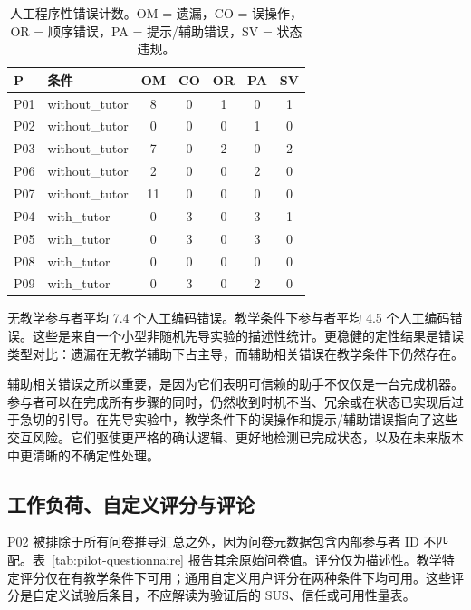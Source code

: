 \begin{table}[htbp]
\centering
\caption{人工程序性错误计数。OM = 遗漏，CO = 误操作，OR = 顺序错误，PA = 提示/辅助错误，SV = 状态违规。}
\label{tab:pilot-errors}
\small
\begin{tabular}{@{}llccccc@{}}
\toprule
\textbf{P} & \textbf{条件} & \textbf{OM} & \textbf{CO} & \textbf{OR} & \textbf{PA} & \textbf{SV} \\
\midrule
P01 & without\_tutor & 8  & 0 & 1 & 0 & 1 \\
P02 & without\_tutor & 0  & 0 & 0 & 1 & 0 \\
P03 & without\_tutor & 7  & 0 & 2 & 0 & 2 \\
P06 & without\_tutor & 2  & 0 & 0 & 2 & 0 \\
P07 & without\_tutor & 11 & 0 & 0 & 0 & 0 \\
\midrule
P04 & with\_tutor & 0  & 3 & 0 & 3 & 1 \\
P05 & with\_tutor & 0  & 3 & 0 & 3 & 0 \\
P08 & with\_tutor & 0  & 0 & 0 & 0 & 0 \\
P09 & with\_tutor & 0  & 3 & 0 & 2 & 0 \\
\bottomrule
\end{tabular}
\end{table}

无教学参与者平均 7.4 个人工编码错误。教学条件下参与者平均 4.5 个人工编码错误。这些是来自一个小型非随机先导实验的描述性统计。更稳健的定性结果是错误类型对比：遗漏在无教学辅助下占主导，而辅助相关错误在教学条件下仍然存在。

辅助相关错误之所以重要，是因为它们表明可信赖的助手不仅仅是一台完成机器。参与者可以在完成所有步骤的同时，仍然收到时机不当、冗余或在状态已实现后过于急切的引导。在先导实验中，教学条件下的误操作和提示/辅助错误指向了这些交互风险。它们驱使更严格的确认逻辑、更好地检测已完成状态，以及在未来版本中更清晰的不确定性处理。

\subsection{工作负荷、自定义评分与评论}

P02 被排除于所有问卷推导汇总之外，因为问卷元数据包含内部参与者 ID 不匹配。表~\ref{tab:pilot-questionnaire} 报告其余原始问卷值。评分仅为描述性。教学特定评分仅在有教学条件下可用；通用自定义用户评分在两种条件下均可用。这些评分是自定义试验后条目，不应解读为验证后的 SUS、信任或可用性量表。

